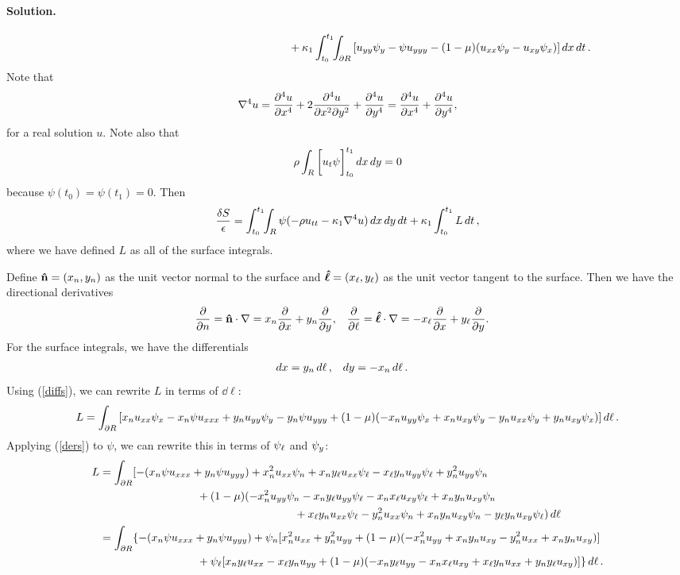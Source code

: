 \documentclass[11pt]{article}
\newcommand{\refeq}[1]{(\ref{#1})}
\newcommand{\beq}{\begin{equation*}}
\newcommand{\eeq}{\end{equation*}}
\newcommand{\beqn}{\begin{equation}}
\newcommand{\eeqn}{\end{equation}}
\newenvironment{solution}
{
    \paragraph{Solution.}
    \ignorespaces
}
{
}
\begin{document}
\begin{solution}
\begin{align*}
		&\phantom{mmmmmmmmmmmmmmmmmmmm} + \kappa_1 \int_{t_0}^{t_1} \!\!\int_{\partial R} \left[ u_{yy} \psi_{y} - \psi u_{yyy} - (1 - \mu) (u_{xx} \psi_{y} - u_{xy} \psi_{x}) \right] \dd{x} \dd{t}.
	\end{align*}
	Note that
	\beqn \label{lapla}
		\lapw u = \pdv[4]{u}{x} + 2 \frac{\partial^4 u}{\partial x^2 \partial y^2} + \pdv[4]{u}{y} = \pdv[4]{u}{x} + \pdv[4]{u}{y},
	\eeqn
	for a real solution $u$.  Note also that
	\beq
		\rho \intr \bigg[\ut \psi\bigg]_{t_0}^{t_1} \dd{x} \dd{y} = 0
	\eeq
	because $\psi(t_0) = \psi(t_1) = 0$.  Then
	\beqn \label{final}
		\frac{\dS}{\eps} = \inttr \psi (-\rho \utt - \kaq \lapw u) \drt + \kaq \intt L \dd{t},
	\eeqn
	where we have defined $L$ as all of the surface integrals.

	Define $\mathbf{\hat{n}} = (x_n, y_n)$ as the unit vector normal to the surface and $\boldsymbol{\hat{\ell}} = (x_\ell, y_\ell)$ as the unit vector tangent to the surface.  Then we have the directional derivatives
	\begin{align} \label{ders}
		\pdv{}{n} &= \mathbf{\hat{n}} \cdot \nabla = x_n \pdv{}{x} + y_n \pdv{}{y}, &
		\pdv{}{\ell} &= \boldsymbol{\hat{\ell}} \cdot \nabla = -x_\ell \pdv{}{x} + y_\ell \pdv{}{y}.
	\end{align}
	For the surface integrals, we have the differentials
	\begin{align} \label{diffs}
		\dd{x} &= y_n \dd{\ell}, &
		\dd{y} &= -x_n \dd{\ell}.
	\end{align}
	Using \refeq{diffs}, we can rewrite $L$ in terms of $\dd{\ell}$:
	\beq
		L = \intdr \left[ \xn \uxx \psix - \xn \psi \uxxx + \yn \uyy \psiy - \yn \psi \uyyy + (1 - \mu) (-\xn \uyy \psix + \xn \uxy \psiy - \yn \uxx \psiy + \yn \uxy \psix) \right] \dd{\ell}.
	\eeq
	Applying \refeq{ders} to $\psi$, we can rewrite this in terms of $\psi_\ell$ and $\psi_{y}$:
\begin{align*}
		L &= \intdr [ - (\xn \psi \uxxx + \yn \psi \uyyy) + \xn^2 \uxx \psin + \xn \yl \uxx \psil - \xl \yn \uyy \psil + \yn^2 \uyy \psin \\
		&\phantom{mmmmmmmmmm} + (1 - \mu) (-\xn^2 \uyy \psin - \xn \yl \uyy \psil - \xn \xl \uxy \psil + \xn \yn \uxy \psin \\
		&\phantom{mmmmmmmmmmmmmmmmmmmm} + \xl \yn \uxx \psil - \yn^2 \uxx \psin + \xn \yn \uxy \psin - \yl \yn \uxy \psil) \dd{\ell} \\
		&= \intdr \{ - (\xn \psi \uxxx + \yn \psi \uyyy) + \psin [\xn^2 \uxx + \yn^2 \uyy + (1 - \mu) (-\xn^2 \uyy + \xn \yn \uxy - \yn^2 \uxx + \xn \yn \uxy)] \\
		&\phantom{mmmmmmmmmm} + \psil [\xn \yl \uxx - \xl \yn \uyy + (1 - \mu) (-\xn \yl \uyy - \xn \xl \uxy + \xl \yn \uxx + \yn \yl \uxy)] \} \dd{\ell}.

\end{align*}
\end{solution}
\end{document}
